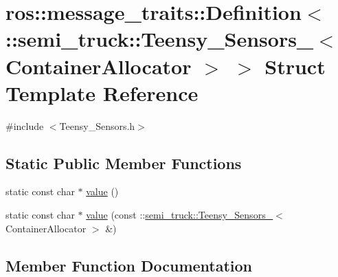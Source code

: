 \hypertarget{structros_1_1message__traits_1_1_definition_3_01_1_1semi__truck_1_1_teensy___sensors___3_01_container_allocator_01_4_01_4}{}\section{ros\+:\+:message\+\_\+traits\+:\+:Definition$<$ \+:\+:semi\+\_\+truck\+:\+:Teensy\+\_\+\+Sensors\+\_\+$<$ Container\+Allocator $>$ $>$ Struct Template Reference}
\label{structros_1_1message__traits_1_1_definition_3_01_1_1semi__truck_1_1_teensy___sensors___3_01_container_allocator_01_4_01_4}


{\ttfamily \#include $<$Teensy\+\_\+\+Sensors.\+h$>$}

\subsection*{Static Public Member Functions}
\begin{DoxyCompactItemize}
\item 
static const char $\ast$ \hyperlink{structros_1_1message__traits_1_1_definition_3_01_1_1semi__truck_1_1_teensy___sensors___3_01_container_allocator_01_4_01_4_a69c5d659f180f04f59860abe2664d819}{value} ()
\item 
static const char $\ast$ \hyperlink{structros_1_1message__traits_1_1_definition_3_01_1_1semi__truck_1_1_teensy___sensors___3_01_container_allocator_01_4_01_4_a770df544a1cdd4fa9c8b43e67c618242}{value} (const \+::\hyperlink{structsemi__truck_1_1_teensy___sensors__}{semi\+\_\+truck\+::\+Teensy\+\_\+\+Sensors\+\_\+}$<$ Container\+Allocator $>$ \&)
\end{DoxyCompactItemize}


\subsection{Member Function Documentation}
